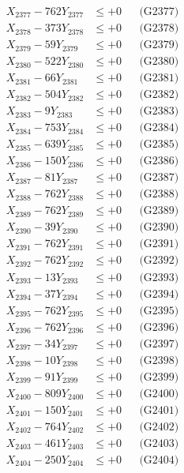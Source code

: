 \documentclass[a4paper,10pt]{article}
\begin{document}
{\begin{align}
X_{2377} - 762Y_{2377} &\leq +0 && \text{(G2377)} \\
X_{2378} - 373Y_{2378} &\leq +0 && \text{(G2378)} \\
X_{2379} - 59Y_{2379} &\leq +0 && \text{(G2379)} \\
X_{2380} - 522Y_{2380} &\leq +0 && \text{(G2380)} \\
\allowbreak
X_{2381} - 66Y_{2381} &\leq +0 && \text{(G2381)} \\
X_{2382} - 504Y_{2382} &\leq +0 && \text{(G2382)} \\
X_{2383} - 9Y_{2383} &\leq +0 && \text{(G2383)} \\
X_{2384} - 753Y_{2384} &\leq +0 && \text{(G2384)} \\
X_{2385} - 639Y_{2385} &\leq +0 && \text{(G2385)} \\
X_{2386} - 150Y_{2386} &\leq +0 && \text{(G2386)} \\
X_{2387} - 81Y_{2387} &\leq +0 && \text{(G2387)} \\
X_{2388} - 762Y_{2388} &\leq +0 && \text{(G2388)} \\
X_{2389} - 762Y_{2389} &\leq +0 && \text{(G2389)} \\
X_{2390} - 39Y_{2390} &\leq +0 && \text{(G2390)} \\
\allowbreak
X_{2391} - 762Y_{2391} &\leq +0 && \text{(G2391)} \\
X_{2392} - 762Y_{2392} &\leq +0 && \text{(G2392)} \\
X_{2393} - 13Y_{2393} &\leq +0 && \text{(G2393)} \\
X_{2394} - 37Y_{2394} &\leq +0 && \text{(G2394)} \\
X_{2395} - 762Y_{2395} &\leq +0 && \text{(G2395)} \\
X_{2396} - 762Y_{2396} &\leq +0 && \text{(G2396)} \\
X_{2397} - 34Y_{2397} &\leq +0 && \text{(G2397)} \\
X_{2398} - 10Y_{2398} &\leq +0 && \text{(G2398)} \\
X_{2399} - 91Y_{2399} &\leq +0 && \text{(G2399)} \\
X_{2400} - 809Y_{2400} &\leq +0 && \text{(G2400)} \\
\allowbreak
X_{2401} - 150Y_{2401} &\leq +0 && \text{(G2401)} \\
X_{2402} - 764Y_{2402} &\leq +0 && \text{(G2402)} \\
X_{2403} - 461Y_{2403} &\leq +0 && \text{(G2403)} \\
X_{2404} - 250Y_{2404} &\leq +0 && \text{(G2404)} \\

\end{align}}
\end{document}
